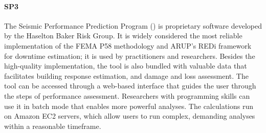\paragraph{SP3} The Seismic Performance Prediction Program () is proprietary software developed by the Haselton Baker Risk Group. It is widely considered the most reliable implementation of the FEMA P58 methodology and ARUP's REDi framework for downtime estimation; it is used by practitioners and researchers. Besides the high-quality implementation, the tool is also bundled with valuable data that facilitates building response estimation, and damage and loss assessment. The tool can be accessed through a web-based interface that guides the user through the steps of performance assessment. Researchers with programming skills can use it in batch mode that enables more powerful analyses. The calculations run on Amazon EC2 servers, which allow users to run complex, demanding analyses within a reasonable timeframe.

